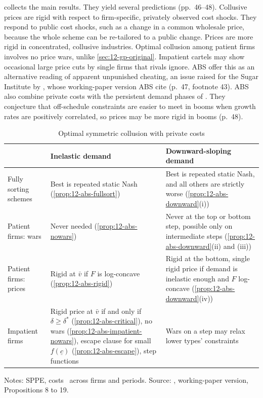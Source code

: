  collects the main results. They yield several predictions (pp.~46--48). Collusive prices
are rigid with respect to firm-specific, privately observed cost shocks. They respond to public cost shocks, such as
a change in a common wholesale price, because the whole scheme can be re-tailored to a public change. Prices are more
rigid in concentrated, collusive industries. Optimal collusion among patient firms involves no price wars, unlike
\cref{sec:12-gp-original}. Impatient cartels may show occasional large price cuts by single firms that rivals ignore.
ABS offer this as an alternative reading of apparent unpunished cheating, an issue raised for the Sugar Institute by
\citet{GenesoveMullin2001}, whose working-paper version ABS cite (p.~47, footnote 43). ABS also combine private costs
with the persistent demand phases of \citet{BagwellStaiger1997}. They conjecture that off-schedule constraints are
easier to meet in booms when growth rates are positively correlated, so prices may be more rigid in booms (p.~48).

\begin{table}[htbp]
\centering
\caption{Optimal symmetric collusion with private costs}\label{tab:12-abs-results}
\begin{tabularx}{\textwidth}{@{}l>{\raggedright\arraybackslash}X>{\raggedright\arraybackslash}X@{}}
\toprule
 & Inelastic demand & Downward-sloping demand \\
\midrule
Fully sorting schemes & Best is repeated static Nash (\cref{prop:12-abs-fullsort}) & Best is repeated static Nash, and all others are strictly worse (\cref{prop:12-abs-downward}(i)) \\
Patient firms: wars & Never needed (\cref{prop:12-abs-nowars}) & Never at the top or bottom step, possible only on intermediate steps (\cref{prop:12-abs-downward}(ii) and (iii)) \\
Patient firms: prices & Rigid at $\bar v$ if $F$ is log-concave (\cref{prop:12-abs-rigid}) & Rigid at the bottom, single rigid price if demand is inelastic enough and $F$ log-concave (\cref{prop:12-abs-downward}(iv)) \\
Impatient firms & Rigid price at $\bar v$ if and only if $\delta \ge \delta^*$ (\cref{prop:12-abs-critical}), no wars (\cref{prop:12-abs-impatient-nowars}), escape clause for small $f(\underline c)$ (\cref{prop:12-abs-escape}), step functions & Wars on a step may relax lower types' constraints \\
\bottomrule
\end{tabularx}

\smallskip
\begin{minipage}{0.95\textwidth}
\footnotesize Notes: SPPE, costs \iid\ across firms and periods. Source: \citet{AtheyBagwellSanchirico2004},
working-paper version, Propositions 8 to 19.
\end{minipage}
\end{table}

